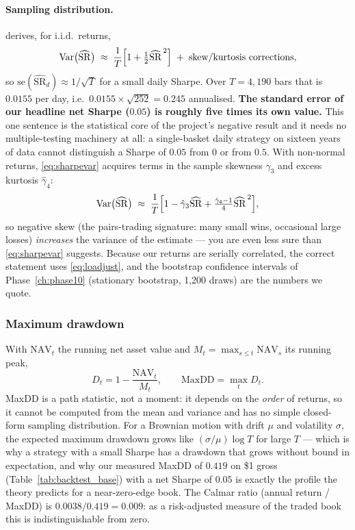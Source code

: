 \paragraph{Sampling distribution.} \cite{lo2002statistics} derives, for i.i.d.\ returns,
\begin{equation}
  \operatorname{Var}\bigl(\widehat{\mathrm{SR}}\bigr) \;\approx\; \frac{1}{T}\Bigl[1 +
  \tfrac12\widehat{\mathrm{SR}}^{\,2}\Bigr]
  \;+\; \text{skew/kurtosis corrections},
  \label{eq:sharpevar}
\end{equation}
so $\mathrm{se}(\widehat{\mathrm{SR}}_d)\approx1/\sqrt T$ for a small daily Sharpe. Over
$T=4{,}190$ bars that is $0.0155$ per day, i.e.\ $0.0155\times\sqrt{252}=0.245$
annualised. \textbf{The standard error of our headline net Sharpe ($0.05$) is roughly five
times its own value.} This one sentence is the statistical core of the project's negative
result and it needs no multiple-testing machinery at all: a single-basket daily strategy
on sixteen years of data cannot distinguish a Sharpe of $0.05$ from $0$ or from $0.5$.
With non-normal returns, \eqref{eq:sharpevar} acquires terms in the sample skewness
$\hat\gamma_3$ and excess kurtosis $\hat\gamma_4$:
\begin{equation}
  \operatorname{Var}\bigl(\widehat{\mathrm{SR}}\bigr) \;\approx\; \frac{1}{T}\Bigl[1 -
  \hat\gamma_3\widehat{\mathrm{SR}} + \tfrac{\hat\gamma_4-1}{4}\widehat{\mathrm{SR}}^{\,2}\Bigr],
  \label{eq:sharpevar2}
\end{equation}
so negative skew (the pairs-trading signature: many small wins, occasional large losses)
\emph{increases} the variance of the estimate --- you are even less sure than
\eqref{eq:sharpevar} suggests. Because our returns are serially correlated, the correct
statement uses \eqref{eq:loadjust}, and the bootstrap confidence intervals of
Phase~\ref{ch:phase10} (stationary bootstrap, 1{,}200 draws) are the numbers we quote.

\subsubsection{Maximum drawdown}

With $\mathrm{NAV}_t$ the running net asset value and
$M_t=\max_{s\le t}\mathrm{NAV}_s$ its running peak,
\begin{equation}
  D_t = 1-\frac{\mathrm{NAV}_t}{M_t},\qquad
  \mathrm{MaxDD} = \max_{t} D_t .
  \label{eq:maxdd}
\end{equation}
MaxDD is a path statistic, not a moment: it depends on the \emph{order} of returns, so it
cannot be computed from the mean and variance and has no simple closed-form sampling
distribution. For a Brownian motion with drift $\mu$ and volatility $\sigma$, the expected
maximum drawdown grows like $(\sigma/\mu)\log T$ for large $T$ --- which is why a strategy
with a small Sharpe has a drawdown that grows without bound in expectation, and why our
measured MaxDD of $0.419$ on \$1 gross (Table~\ref{tab:backtest_base}) with a net Sharpe
of $0.05$ is exactly the profile the theory predicts for a near-zero-edge book. The
Calmar ratio (annual return / MaxDD) is $0.0038/0.419=0.009$: as a risk-adjusted measure
of the traded book this is indistinguishable from zero.

